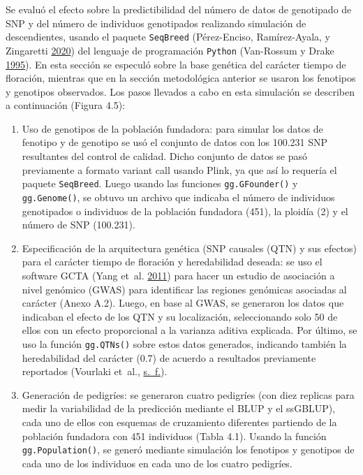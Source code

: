 \documentclass[11pt,spanish,a4paper,oneside,]{book} %
\begin{document}
Se evaluó el efecto sobre la predictibilidad del número de datos de genotipado de SNP y del número de individuos genotipados realizando simulación de descendientes, usando el paquete \texttt{SeqBreed} (Pérez-Enciso, Ramírez-Ayala, y Zingaretti \protect\hyperlink{ref-cite:47}{2020}) del lenguaje de programación \texttt{Python} (Van-Rossum y Drake \protect\hyperlink{ref-cite:53}{1995}). En esta sección se especuló sobre la base genética del carácter tiempo de floración, mientras que en la sección metodológica anterior se usaron los fenotipos y genotipos observados. Los pasos llevados a cabo en esta simulación se describen a continuación (Figura 4.5):

\begin{enumerate}
\def\labelenumi{\arabic{enumi}.}
\item
  Uso de genotipos de la población fundadora: para simular los datos de fenotipo y de genotipo se usó el conjunto de datos con los 100.231 SNP resultantes del control de calidad. Dicho conjunto de datos se pasó previamente a formato variant call usando Plink, ya que así lo requería el paquete \texttt{SeqBreed}. Luego usando las funciones \texttt{gg.GFounder()} y \texttt{gg.Genome()}, se obtuvo un archivo que indicaba el número de individuos genotipados o individuos de la población fundadora (451), la ploidía (2) y el número de SNP (100.231).
\item
  Especificación de la arquitectura genética (SNP causales (QTN) y sus efectos) para el carácter tiempo de floración y heredabilidad deseada: se uso el software GCTA (Yang et~al. \protect\hyperlink{ref-cite:54}{2011}) para hacer un estudio de asociación a nivel genómico (GWAS) para identificar las regiones genómicas asociadas al carácter (Anexo A.2). Luego, en base al GWAS, se generaron los datos que indicaban el efecto de los QTN y su localización, seleccionando solo 50 de ellos con un efecto proporcional a la varianza aditiva explicada. Por último, se uso la función \texttt{gg.QTNs()} sobre estos datos generados, indicando también la heredabilidad del carácter (0.7) de acuerdo a resultados previamente reportados (Vourlaki et~al., \protect\hyperlink{ref-cite:26}{s.~f.}).
\item
  Generación de pedigríes: se generaron cuatro pedigríes (con diez replicas para medir la variabilidad de la predicción mediante el BLUP y el ssGBLUP), cada uno de ellos con esquemas de cruzamiento diferentes partiendo de la población fundadora con 451 individuos (Tabla 4.1). Usando la función \texttt{gg.Population()}, se generó mediante simulación los fenotipos y genotipos de cada uno de los individuos en cada uno de los cuatro pedigríes.
  \hspace*{1em}
\end{enumerate}
\end{document}

